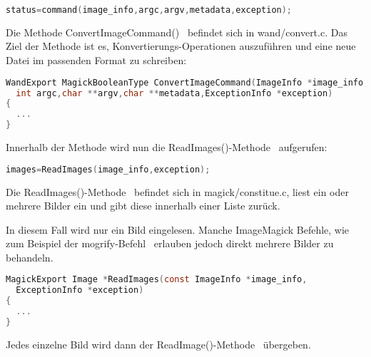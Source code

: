 \begin{lstlisting}[firstnumber=172, language=C, caption=wand/migrify.c Aufruf des ConvertImageCommand,label={lst:lstlisting}]
status=command(image_info,argc,argv,metadata,exception);
\end{lstlisting}
\vspace{5mm}


Die Methode ConvertImageCommand()~\cite{DeklarationConvertIMageCommand} befindet sich in wand/convert.c. Das Ziel der Methode ist es, Konvertierungs-Operationen auszuführen und eine neue Datei im passenden Format zu schreiben:\\

\begin{lstlisting}[firstnumber=498, language=C, caption=wand/convert.c ConvertImageCommand(),label={lst:lstlisting}]
WandExport MagickBooleanType ConvertImageCommand(ImageInfo *image_info,
  int argc,char **argv,char **metadata,ExceptionInfo *exception)
{
  ...
}
\end{lstlisting}
\vspace{5mm}

Innerhalb der Methode wird nun die ReadImages()-Methode~\cite{AufrufReadImages} aufgerufen:

\begin{lstlisting}[firstnumber=628, language=C, caption=wand/convert.c Aufruf ReadImages(),label={lst:lstlisting}]
  images=ReadImages(image_info,exception);
\end{lstlisting}
\vspace{5mm}

Die ReadImages()-Methode~\cite{DeklarationReadImages} befindet sich in magick/constitue.c,
liest ein oder mehrere Bilder ein und gibt diese innerhalb einer Liste zurück.

\newpage

In diesem Fall wird nur ein Bild eingelesen.
Manche ImageMagick Befehle, wie zum Beispiel der mogrify-Befehl~\cite{MogrifyCommand} erlauben jedoch direkt mehrere Bilder zu behandeln.\\

\begin{lstlisting}[firstnumber=790, language=C, caption=magick/constitute.c ReadImages(),label={lst:lstlisting}]
MagickExport Image *ReadImages(const ImageInfo *image_info,
  ExceptionInfo *exception)
{
  ...
}
\end{lstlisting}
\vspace{5mm}

Jedes einzelne Bild wird dann der ReadImage()-Methode~\cite{DeklarationReadImage} übergeben.\\

